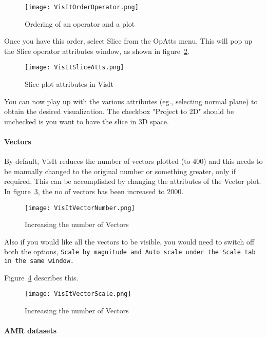 \begin{figure}
  \center
  \texttt{[image: VisItOrderOperator.png]}
  \caption{Ordering of an operator and a plot}
  \label{VisItOrderOperator}
\end{figure}

Once you have this order, select Slice from the OpAtts menu. This will pop up the Slice operator attributes window, as shown in figure~\ref{VisItSliceAtts}.

\begin{figure}
  \center
  \texttt{[image: VisItSliceAtts.png]}
  \caption{Slice plot attributes in VisIt}
  \label{VisItSliceAtts}
\end{figure}

You can now play up with the various attributes (eg., selecting normal plane) to obtain the desired visualization. The checkbox "Project to 2D" should be unchecked is you want to have the slice in 3D space.

\paragraph{Vectors}

By default, VisIt reduces the number of vectors plotted (to 400) and this needs to be manually changed to the original number or something greater, only if required.
This can be accomplished by changing the attributes of the Vector plot. In figure~\ref{VisItVectorNumber}, the no of vectors has been increased to 2000.

\begin{figure}
  \center
  \texttt{[image: VisItVectorNumber.png]}
  \caption{Increasing the number of Vectors}
  \label{VisItVectorNumber}
\end{figure}

Also if you would like all the vectors to be visible, you would need to switch off both the options,
\tt Scale by magnitude
\normalfont and
\tt Auto scale
\normalfont under the Scale tab in the same window.

Figure~\ref{VisItVectorScale} describes this.

\begin{figure}
  \center
  \texttt{[image: VisItVectorScale.png]}
  \caption{Increasing the number of Vectors}
  \label{VisItVectorScale}
\end{figure}

\paragraph{AMR datasets}


